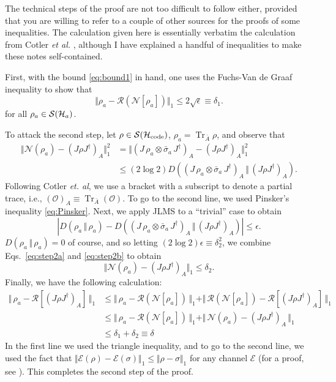 \documentclass[a4paper,11pt]{article}
\newcommand{\Eqs}[2]{Eqs.~\eqref{#1} and \eqref{#2}}
\DeclareMathOperator{\Tr}{Tr}
\newcommand{\rent}[2]{D( #1 \, \Vert \, #2 )}
\newcommand{\Hil}{{\cal H}}
\newcommand{\Oh}{{\mathcal{O}}}
\newcommand{\mrm}[1]{\mathrm{#1}}
\begin{document}
The technical steps of the proof are not too difficult to follow either, provided that you are willing to refer to a couple of other sources for the proofs of some inequalities.
The calculation given here is essentially verbatim the calculation from Cotler \emph{et al.} \cite{Cotler:2017erl}, although I have explained a handful of inequalities to make these notes self-contained.

First, with the bound \eqref{eq:bound1} in hand, one uses the Fuchs-Van de Graaf inequality \cite{761271} to show that
\begin{equation} \label{eq:step1a}
\Vert \rho_a - \mathcal{R}(\mathcal{N}[\rho_a]) \Vert_1 \leq 2 \sqrt{\epsilon} \equiv \delta_1 .
\end{equation}
for all $\rho_a \in \mathcal{S}(\Hil_a)$.

To attack the second step, let $\rho \in \mathcal{S}(\Hil_\mrm{code})$, $\rho_a = \Tr_{\bar A} \rho$, and observe that
\begin{align}
\nonumber \Vert \mathcal{N}(\rho_a) - (J \rho J^\dagger)_A \Vert_1^2 &= \Vert (J \, \rho_a \otimes \bar{\sigma}_a \, J^\dagger)_A - (J \rho J^\dagger)_A \Vert_1^2 \\
&\leq (2 \log 2) \rent{(J \, \rho_a \otimes \bar{\sigma}_a \, J^\dagger)_A}{(J \rho J^\dagger)_A} . \label{eq:step2a}
\end{align}
Following Cotler \emph{et. al}, we use a bracket with a subscript to denote a partial trace, i.e., $(\Oh)_A \equiv \Tr_{\bar A}(\Oh)$.
To go to the second line, we used Pinsker's inequality \eqref{eq:Pinsker}.
Next, we apply JLMS to a ``trivial'' case to obtain
\begin{equation} \label{eq:step2b}
| \rent{\rho_a}{\rho_a} - \rent{(J \, \rho_a \otimes \bar{\sigma}_a \, J^\dagger)_A}{(J \rho J^\dagger)_A} | \leq \epsilon .
\end{equation}
$\rent{\rho_a}{\rho_a} = 0$ of course, and so letting $(2 \log 2) \epsilon \equiv \delta_2^2$, we combine \Eqs{eq:step2a}{eq:step2b} to obtain
\begin{equation} \label{eq:step2c}
\Vert \mathcal{N}(\rho_a) - (J \rho J^\dagger)_A \Vert_1 \leq \delta_2 .
\end{equation}
Finally, we have the following calculation:
\begin{align*}
\Vert \, \rho_a - \mathcal{R}[(J \rho J^\dagger)_A] \, \Vert_1 & \leq \Vert \, \rho_a - \mathcal{R}(\mathcal{N}[\rho_a]) \, \Vert_1 + \Vert \, \mathcal{R}(\mathcal{N}[\rho_a]) - \mathcal{R}[(J\rho J^\dagger)_A] \, \Vert_1 \\
&\leq  \Vert \, \rho_a - \mathcal{R}(\mathcal{N}[\rho_a]) \, \Vert_1 + \Vert \, \mathcal{N}(\rho_a) - (J\rho J^\dagger)_A \, \Vert_1 \\
&\leq \delta_1 + \delta_2 \equiv \delta
\end{align*}
In the first line we used the triangle inequality, and to go to the second line, we used the fact that $\Vert \mathcal{E}(\rho) - \mathcal{E}(\sigma) \Vert_1 \leq \Vert \rho - \sigma \Vert_1$ for any channel $\mathcal{E}$ (for a proof, see \cite[Exercise 9.1.9]{Wilde:2011npi}).
This completes the second step of the proof.
\end{document}
